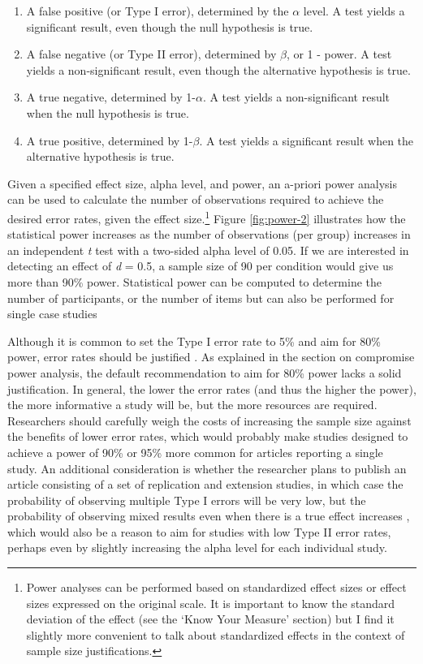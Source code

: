 \documentclass[
]{krantz}
\providecommand{\tightlist}{%
  \setlength{\itemsep}{0pt}\setlength{\parskip}{0pt}}
\begin{document}
\begin{enumerate}
\def\labelenumi{\arabic{enumi}.}
\tightlist
\item
  A false positive (or Type I error), determined by the \(\alpha\) level. A test yields a significant result, even though the null hypothesis is true.
\item
  A false negative (or Type II error), determined by \(\beta\), or 1 - power. A test yields a non-significant result, even though the alternative hypothesis is true.
\item
  A true negative, determined by 1-\(\alpha\). A test yields a non-significant result when the null hypothesis is true.
\item
  A true positive, determined by 1-\(\beta\). A test yields a significant result when the alternative hypothesis is true.
\end{enumerate}

Given a specified effect size, alpha level, and power, an a-priori power analysis can be used to calculate the number of observations required to achieve the desired error rates, given the effect size.\footnote{Power analyses can be performed based on standardized effect sizes or effect sizes expressed on the original scale. It is important to know the standard deviation of the effect (see the `Know Your Measure' section) but I find it slightly more convenient to talk about standardized effects in the context of sample size justifications.} Figure \ref{fig:power-2} illustrates how the statistical power increases as the number of observations (per group) increases in an independent \emph{t} test with a two-sided alpha level of 0.05. If we are interested in detecting an effect of \emph{d} = 0.5, a sample size of 90 per condition would give us more than 90\% power. Statistical power can be computed to determine the number of participants, or the number of items \citep{westfall_statistical_2014} but can also be performed for single case studies \citep{ferron_power_1996, mcintosh_power_2020}

Although it is common to set the Type I error rate to 5\% and aim for 80\% power, error rates should be justified \citep{lakens_justify_2018}. As explained in the section on compromise power analysis, the default recommendation to aim for 80\% power lacks a solid justification. In general, the lower the error rates (and thus the higher the power), the more informative a study will be, but the more resources are required. Researchers should carefully weigh the costs of increasing the sample size against the benefits of lower error rates, which would probably make studies designed to achieve a power of 90\% or 95\% more common for articles reporting a single study. An additional consideration is whether the researcher plans to publish an article consisting of a set of replication and extension studies, in which case the probability of observing multiple Type I errors will be very low, but the probability of observing mixed results even when there is a true effect increases \citep{lakens_too_2017}, which would also be a reason to aim for studies with low Type II error rates, perhaps even by slightly increasing the alpha level for each individual study.
\end{document}
